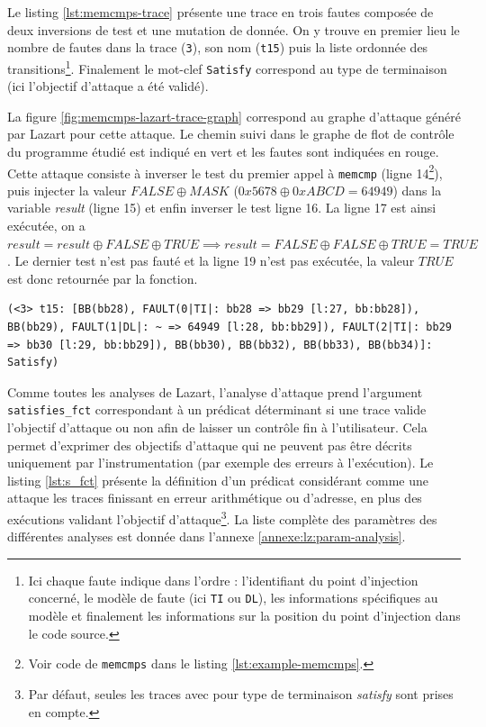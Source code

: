             Le listing \ref{lst:memcmps-trace} présente une trace en trois fautes composée de deux inversions de test et une mutation de donnée.
            On y trouve en premier lieu le nombre de fautes dans la trace (\texttt{3}), son nom (\texttt{t15}) puis la liste ordonnée des transitions\footnote{Ici chaque faute indique dans l'ordre : l'identifiant du point d'injection concerné, le modèle de faute (ici \texttt{TI} ou \texttt{DL}), les informations spécifiques au modèle et finalement les informations sur la position du point d'injection dans le code source.}. Finalement le mot-clef \texttt{Satisfy} correspond au type de terminaison (ici l'objectif d'attaque a été validé).
            
            La figure \ref{fig:memcmps-lazart-trace-graph} correspond au graphe d'attaque généré par Lazart pour cette attaque. Le chemin suivi dans le graphe de flot de contrôle du programme étudié est indiqué en vert et les fautes sont indiquées en rouge.
            Cette attaque consiste à inverser le test du premier appel à \texttt{memcmp} (ligne 14\footnote{Voir code de \texttt{memcmps} dans le listing \ref{lst:example-memcmps}.}), puis injecter la valeur $FALSE \oplus MASK$ ($0x5678 \oplus 0xABCD = 64949$) dans la variable \textit{result} (ligne 15) et enfin inverser le test ligne 16. La ligne 17 est ainsi exécutée, on a $result = result \oplus FALSE \oplus TRUE \implies result = FALSE \oplus FALSE \oplus TRUE = TRUE$. Le dernier test n'est pas fauté et la ligne 19 n'est pas exécutée, la valeur $TRUE$ est donc retournée par la fonction.
                
\begin{lstlisting}   
(<3> t15: [BB(bb28), FAULT(0|TI|: bb28 => bb29 [l:27, bb:bb28]), BB(bb29), FAULT(1|DL|: ~ => 64949 [l:28, bb:bb29]), FAULT(2|TI|: bb29 => bb30 [l:29, bb:bb29]), BB(bb30), BB(bb32), BB(bb33), BB(bb34)]: Satisfy)
\end{lstlisting}               
                    
            \begin{sloppypar}
            Comme toutes les analyses de Lazart, l'analyse d'attaque prend l'argument \texttt{satisfies\_fct} correspondant à un prédicat déterminant si une trace valide l'objectif d'attaque ou non afin de laisser un contrôle fin à l'utilisateur. 
            Cela permet d'exprimer des objectifs d'attaque qui ne peuvent pas être décrits uniquement par l'instrumentation (par exemple des erreurs à l'exécution). 
            Le listing \ref{lst:s_fct} présente la définition d'un prédicat considérant comme une attaque les traces finissant en erreur arithmétique ou d'adresse, en plus des exécutions validant l'objectif d'attaque\footnote{Par défaut, seules les traces avec pour type de terminaison \textit{satisfy} sont prises en compte.}.
            La liste complète des paramètres des différentes analyses est donnée dans l'annexe \ref{annexe:lz:param-analysis}.                    
            \end{sloppypar}
                
